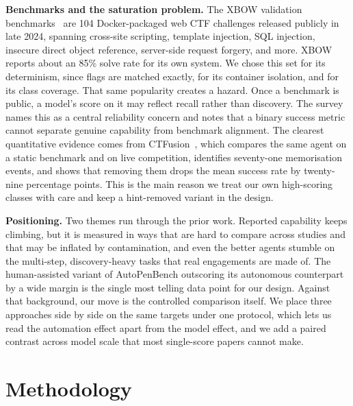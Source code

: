 \documentclass[conference]{IEEEtran}
\begin{document}
\textbf{Benchmarks and the saturation problem.}
The XBOW validation benchmarks~\cite{xbow2024} are 104 Docker-packaged web CTF challenges released publicly in late 2024, spanning cross-site scripting, template injection, SQL injection, insecure direct object reference, server-side request forgery, and more. XBOW reports about an 85\% solve rate for its own system. We chose this set for its determinism, since flags are matched exactly, for its container isolation, and for its class coverage. That same popularity creates a hazard. Once a benchmark is public, a model's score on it may reflect recall rather than discovery. The survey~\cite{he2026} names this as a central reliability concern and notes that a binary success metric cannot separate genuine capability from benchmark alignment. The clearest quantitative evidence comes from CTFusion~\cite{lee2026}, which compares the same agent on a static benchmark and on live competition, identifies seventy-one memorisation events, and shows that removing them drops the mean success rate by twenty-nine percentage points. This is the main reason we treat our own high-scoring classes with care and keep a hint-removed variant in the design.

\textbf{Positioning.}
Two themes run through the prior work. Reported capability keeps climbing, but it is measured in ways that are hard to compare across studies and that may be inflated by contamination, and even the better agents stumble on the multi-step, discovery-heavy tasks that real engagements are made of. The human-assisted variant of AutoPenBench outscoring its autonomous counterpart by a wide margin is the single most telling data point for our design. Against that background, our move is the controlled comparison itself. We place three approaches side by side on the same targets under one protocol, which lets us read the automation effect apart from the model effect, and we add a paired contrast across model scale that most single-score papers cannot make.

\section{Methodology}
\label{sec:method}
\end{document}
